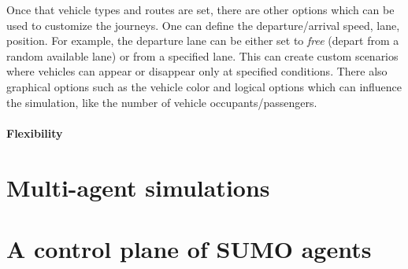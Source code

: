 
Once that vehicle types and routes are set, there are other options which can be used to customize the journeys. One can define the departure/arrival speed, lane, position. For example, the departure lane can be either set to \textit{free} (depart from a random available lane) or from a specified lane. This can create custom scenarios where vehicles can appear or disappear only at specified conditions. There also graphical options such as the vehicle color and logical options which can influence the simulation, like the number of vehicle occupants/passengers.

\paragraph{Flexibility}


\section{Multi-agent simulations}


\section{A control plane of SUMO agents}

